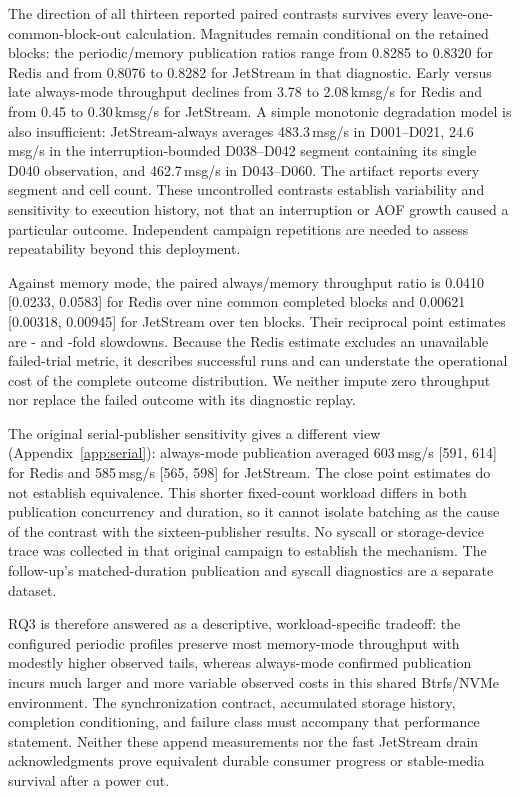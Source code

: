 The direction of all thirteen reported paired contrasts survives every leave-one-common-block-out calculation. Magnitudes remain conditional on the retained blocks: the periodic/memory publication ratios range from 0.8285 to 0.8320 for Redis and from 0.8076 to 0.8282 for JetStream in that diagnostic. Early versus late always-mode throughput declines from 3.78 to 2.08\,kmsg/s for Redis and from 0.45 to 0.30\,kmsg/s for JetStream. A simple monotonic degradation model is also insufficient: JetStream-always averages 483.3\,msg/s in D001--D021, 24.6\,msg/s in the interruption-bounded D038--D042 segment containing its single D040 observation, and 462.7\,msg/s in D043--D060. The artifact reports every segment and cell count. These uncontrolled contrasts establish variability and sensitivity to execution history, not that an interruption or AOF growth caused a particular outcome. Independent campaign repetitions are needed to assess repeatability beyond this deployment.


Against memory mode, the paired always/memory throughput ratio is 0.0410 [0.0233, 0.0583] for Redis over nine common completed blocks and 0.00621 [0.00318, 0.00945] for JetStream over ten blocks. Their reciprocal point estimates are \RedisSyncSlowdown{}- and \NatsSyncSlowdown{}-fold slowdowns. Because the Redis estimate excludes an unavailable failed-trial metric, it describes successful runs and can understate the operational cost of the complete outcome distribution. We neither impute zero throughput nor replace the failed outcome with its diagnostic replay.

The original serial-publisher sensitivity gives a different view (Appendix~\ref{app:serial}): always-mode publication averaged 603\,msg/s [591, 614] for Redis and 585\,msg/s [565, 598] for JetStream. The close point estimates do not establish equivalence. This shorter fixed-count workload differs in both publication concurrency and duration, so it cannot isolate batching as the cause of the contrast with the sixteen-publisher results. No syscall or storage-device trace was collected in that original campaign to establish the mechanism. The follow-up's matched-duration publication and syscall diagnostics are a separate dataset.

RQ3 is therefore answered as a descriptive, workload-specific tradeoff: the configured periodic profiles preserve most memory-mode throughput with modestly higher observed tails, whereas always-mode confirmed publication incurs much larger and more variable observed costs in this shared Btrfs/NVMe environment. The synchronization contract, accumulated storage history, completion conditioning, and failure class must accompany that performance statement. Neither these append measurements nor the fast JetStream drain acknowledgments prove equivalent durable consumer progress or stable-media survival after a power cut.

